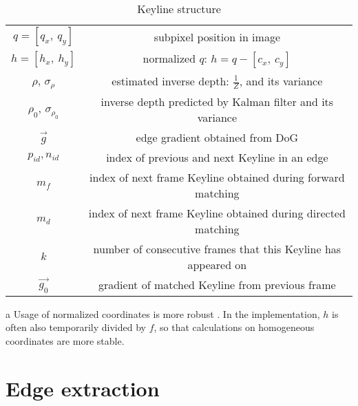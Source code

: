 \begin{table}[ht]
	\centering
	
	\begin{threeparttable}
		\caption{Keyline structure}
		\label{tab:keyline}
		
		\begin{tabularx}{1.0\textwidth}{C{0.25} C{0.75}}
			\toprule
			 &  \\
			\midrule
			$q = [q_{x},\ q_{y}]$ & subpixel position in image \\
			$h = [h_{x},\ h_{y}]$ & normalized $q$: $h = q - [c_{x},\ c_{y}]$ \\
			$\rho$, $\sigma_{\rho}$ & estimated inverse depth: $\frac{1}{Z}$, and its variance \\
			$\rho_0$, $\sigma_{\rho_{0}}$ & inverse depth predicted by Kalman filter and its variance \\
			$\vec{g}$ & edge gradient obtained from DoG \\
			$p_{id}, n_{id}$ & index of previous and next Keyline in an edge \\
			$m_f$ & index of next frame Keyline obtained during forward matching \\
			$m_d$ & index of next frame Keyline obtained during directed matching \\
			$k$ & number of consecutive frames that this Keyline has appeared on \\
			$\vec{g_{0}}$ & gradient of matched Keyline from previous frame \\
			\bottomrule
		\end{tabularx}
		
		\begin{tablenotes}
			\footnotesize
			\item[a] Usage of normalized coordinates is more robust \cite{hartley1997defense}. In the implementation, $h$ is often also temporarily divided by $f$, so that calculations on homogeneous coordinates are more stable.
		\end{tablenotes}
		
	\end{threeparttable}
\end{table}


\section{Edge extraction}

